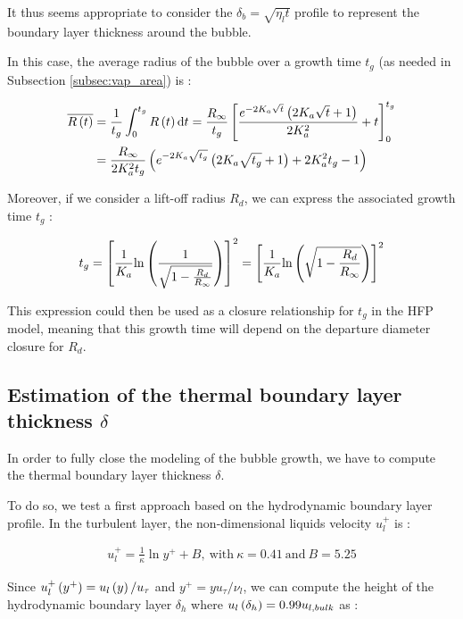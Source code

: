 It thus seems appropriate to consider the $\delta_{b}=\sqrt{\eta_{l}t}$ profile to represent the boundary layer thickness around the bubble.

\npar


In this case, the average radius of the bubble over a growth time $t_{g}$ (as needed in Subsection \ref{subsec:vap_area}) is :


\begin{align}
\overline{R\left( t \right)}&=\frac{1}{t_{g}}\int_{0}^{t_{g}}R\left( t \right) \text{d}t = \frac{R_{\infty}}{t_{g}}\left[  \frac{e^{-2K_{a}\sqrt{t}} \left( 2K_{a}\sqrt{t}+1 \right)  }{2K_{a}^{2}}+ t \right]_{0}^{t_{g}}\\
&=\frac{R_{\infty}}{2K_{a}^{2}t_{g}}\left(  e^{-2K_{a}\sqrt{t_{g}}}\left( 2K_{a}\sqrt{t_{g}}+1 \right) + 2K_{a}^{2}t_{g} -1   \right)
\end{align}

Moreover, if we consider a lift-off radius $R_{d}$, we can express the associated growth time $t_{g}$ :

\begin{align}
t_{g}=\left[  \frac{1}{K_{a}}\mathrm{ln}\left( \frac{1}{\sqrt{1-\frac{R_{d}}{R_{\infty}} } }  \right)  \right]^{2} = \left[ \frac{1}{K_{a}}\mathrm{ln}\left(  \sqrt{1-\frac{R_{d}}{R_{\infty}} }  \right)    \right]^{2}
\label{eq:growth_time}
\end{align}

This expression could then be used as a closure relationship for $t_{g}$ in the HFP model, meaning that this growth time will depend on the departure diameter closure for $R_{d}$.


\subsection{Estimation of the thermal boundary layer thickness $\delta$}

In order to fully close the modeling of the bubble growth, we have to compute the thermal boundary layer thickness $\delta$.

To do so, we test a first approach based on the hydrodynamic boundary layer profile. In the turbulent layer, the non-dimensional liquids velocity $u_{l}^{+}$ is :

\begin{align}
u_{l}^{+}=\frac{1}{\kappa} \ln{y^{+}} +B,\ \text{with}\ \kappa=0.41\ \text{and}\ B=5.25
\end{align}

Since $u_{l}^{+}\left( y^{+} \right)=u_{l}\left( y \right)/u_{\tau}$ and $y^{+}=yu_{\tau}/\nu_{l}$, we can compute the height of the hydrodynamic boundary layer $\delta_{h}$ where $u_{l}\left( \delta_{h} \right)=0.99u_{l,bulk}$ as :

